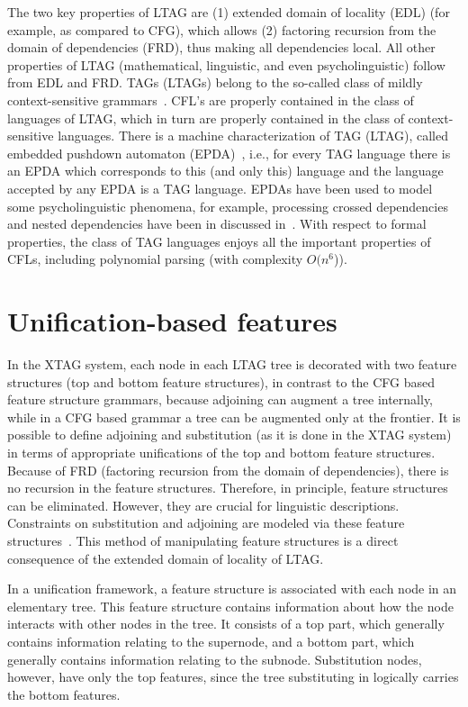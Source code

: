 The two key properties of LTAG are (1) extended domain of locality
(EDL) (for example, as compared to CFG), which allows (2) factoring
recursion from the domain of dependencies (FRD), thus making all
dependencies local. All other properties of LTAG (mathematical,
linguistic, and even psycholinguistic) follow from EDL and FRD. TAGs
(LTAGs) belong to the so-called class of mildly context-sensitive
grammars~\cite{joshi85}. CFL's are properly contained in the class of
languages of LTAG, which in turn are properly contained in the class
of context-sensitive languages. There is a machine characterization of
TAG (LTAG), called embedded pushdown automaton (EPDA)~\cite{vijay87},
i.e., for every TAG language there is an EPDA which corresponds to
this (and only this) language and the language accepted by any EPDA is
a TAG language. EPDAs have been used to model some psycholinguistic
phenomena, for example, processing crossed dependencies and nested
dependencies have been in discussed in~\cite{joshi90}. With respect to
formal properties, the class of TAG languages enjoys all the important
properties of CFLs, including polynomial parsing (with complexity
$O(n^{6}$)).

\section{Unification-based features}

In the XTAG system, each node in each LTAG tree is decorated with two
feature structures (top and bottom feature structures), in contrast to
the CFG based feature structure grammars, because adjoining can augment
a tree internally, while in a CFG based grammar a tree can be augmented
only at the frontier. It is possible to define adjoining and
substitution (as it is done in the XTAG system) in terms of appropriate
unifications of the top and bottom feature structures. Because of FRD
(factoring recursion from the domain of dependencies), there is no
recursion in the feature structures. Therefore, in principle, feature
structures can be eliminated. However, they are crucial for linguistic
descriptions. Constraints on substitution and adjoining are modeled via
these feature structures~\cite{vijay87}. This method of manipulating
feature structures is a direct consequence of the extended domain of
locality of LTAG.

In a unification framework, a feature structure is associated with each
node in an elementary tree.  This feature structure contains
information about how the node interacts with other nodes in the tree.
It consists of a top part, which generally contains information
relating to the supernode, and a bottom part, which generally contains
information relating to the subnode.  Substitution nodes, however, have
only the top features, since the tree substituting in logically carries
the bottom features.

